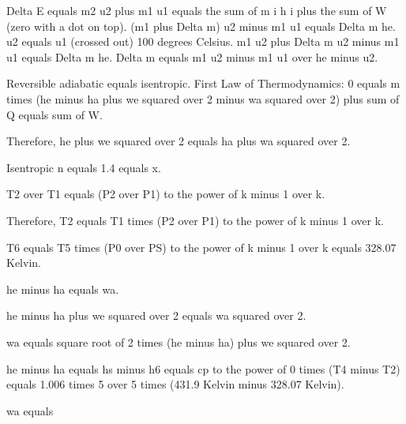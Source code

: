Delta E equals m2 u2 plus m1 u1 equals the sum of m i h i plus the sum of W (zero with a dot on top).
(m1 plus Delta m) u2 minus m1 u1 equals Delta m he.
u2 equals u1 (crossed out) 100 degrees Celsius.
m1 u2 plus Delta m u2 minus m1 u1 equals Delta m he.
Delta m equals m1 u2 minus m1 u1 over he minus u2.

Reversible adiabatic equals isentropic.  
First Law of Thermodynamics:  
0 equals m times (he minus ha plus we squared over 2 minus wa squared over 2) plus sum of Q equals sum of W.  

Therefore, he plus we squared over 2 equals ha plus wa squared over 2.  

Isentropic n equals 1.4 equals x.  

T2 over T1 equals (P2 over P1) to the power of k minus 1 over k.  

Therefore, T2 equals T1 times (P2 over P1) to the power of k minus 1 over k.  

T6 equals T5 times (P0 over PS) to the power of k minus 1 over k equals 328.07 Kelvin.  

he minus ha equals wa.  

he minus ha plus we squared over 2 equals wa squared over 2.  

wa equals square root of 2 times (he minus ha) plus we squared over 2.  

he minus ha equals hs minus h6 equals cp to the power of 0 times (T4 minus T2) equals 1.006 times 5 over 5 times (431.9 Kelvin minus 328.07 Kelvin).  

wa equals